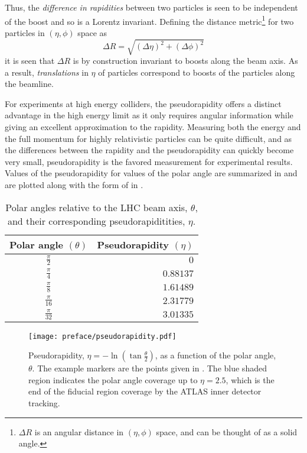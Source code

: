 Thus, the \emph{difference in rapidities} between two particles is seen to be independent of the boost and so is a \Gls{Lorentz invariant}.
Defining the distance metric\footnote{$\Delta R$ is an angular distance in $\left(\eta, \phi\right)$ space, and can be thought of as a solid angle.} for two particles in $\left(\eta, \phi\right)$ space as
\begin{equation}
 \Delta R = \sqrt{\left(\Delta\eta\right)^{2} + \left(\Delta\phi\right)^{2}}
 \label{eq:DeltaR}
\end{equation}
it is seen that $\Delta R$ is by construction invariant to boosts along the beam axis.
As a result, \emph{translations} in $\eta$ of particles correspond to \glspl{boost} of the particles along the beamline.

For experiments at high energy colliders, the pseudorapidity offers a distinct advantage in the high energy limit as it only requires angular information while giving an excellent approximation to the rapidity.
Measuring both the energy and the full momentum for highly relativistic particles can be quite difficult, and as the differences between the rapidity and the pseudorapidity can quickly become very small, pseudorapidity is the favored measurement for experimental results.
Values of the pseudorapidity for values of the polar angle are summarized in  and are plotted along with the form of  in .

\begin{table}[htpb]
 \centering
 \caption{Polar angles relative to the LHC beam axis, $\theta$, and their corresponding pseudorapiditities, $\eta$.}
 \begin{tabular}{@{}cr@{}} \toprule
  Polar angle $(\theta)$ & Pseudorapidity $(\eta)$ \\ \midrule
  $\frac{\pi}{2}$        & $0$                     \\
  $\frac{\pi}{4}$        & $0.88137$               \\
  $\frac{\pi}{8}$        & $1.61489$               \\
  $\frac{\pi}{16}$       & $2.31779$               \\
  $\frac{\pi}{32}$       & $3.01335$               \\
  \bottomrule
 \end{tabular}\label{table:pseudorapidity_angles}%
\end{table}

\begin{figure}[htbp]
 \centering
 \texttt{[image: preface/pseudorapidity.pdf]}
 \caption[Pseudorapidity as a function of the polar angle.]{%
  Pseudorapidity, $\eta = - \ln \left(\tan \frac{\theta}{2}\right)$, as a function of the polar angle, $\theta$.
  The example markers are the points given in .
  The blue shaded region indicates the polar angle coverage up to $\eta = 2.5$, which is the end of the fiducial region coverage by the ATLAS inner detector tracking.}
 \label{fig:pseudorapidity_angles}
\end{figure}

